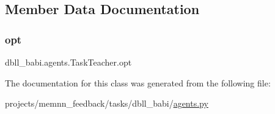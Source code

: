 \subsection{Member Data Documentation}
\mbox{\label{classdbll__babi_1_1agents_1_1TaskTeacher_abe6872d5eda75ca8a15ecf4785086c48}} 
\subsubsection{\texorpdfstring{opt}{opt}}
{\footnotesize\ttfamily dbll\+\_\+babi.\+agents.\+Task\+Teacher.\+opt}



The documentation for this class was generated from the following file\+:\begin{DoxyCompactItemize}
\item 
projects/memnn\+\_\+feedback/tasks/dbll\+\_\+babi/\hyperlink{projects_2memnn__feedback_2tasks_2dbll__babi_2agents_8py}{agents.\+py}\end{DoxyCompactItemize}
